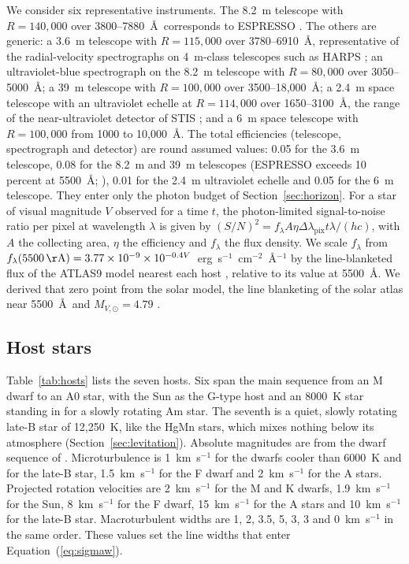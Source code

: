 \documentclass[final,5p]{elsarticle}
\begin{document}
We consider six representative instruments. The 8.2~m telescope with $R = 140{,}000$ over 3800--7880~\AA\ corresponds to ESPRESSO \citep{Pepe2021}. The others are generic: a 3.6~m telescope with $R = 115{,}000$ over 3780--6910~\AA, representative of the radial-velocity spectrographs on 4~m-class telescopes such as HARPS \citep{Mayor2003}; an ultraviolet-blue spectrograph on the 8.2~m telescope with $R = 80{,}000$ over 3050--5000~\AA; a 39~m telescope with $R = 100{,}000$ over 3500--18{,}000~\AA; a 2.4~m space telescope with an ultraviolet echelle at $R = 114{,}000$ over 1650--3100~\AA, the range of the near-ultraviolet detector of STIS \citep{Woodgate1998}; and a 6~m space telescope with $R = 100{,}000$ from 1000 to 10{,}000~\AA. The total efficiencies (telescope, spectrograph and detector) are round assumed values: 0.05 for the 3.6~m telescope, 0.08 for the 8.2~m and 39~m telescopes (ESPRESSO exceeds 10 percent at 5500~\AA; \citealt{Pepe2021}), 0.01 for the 2.4~m ultraviolet echelle and 0.05 for the 6~m telescope. They enter only the photon budget of Section~\ref{sec:horizon}. For a star of visual magnitude $V$ observed for a time $t$, the photon-limited signal-to-noise ratio per pixel at wavelength $\lambda$ is given by $(S/N)^2 = f_\lambda A \eta \Delta\lambda_\mathrm{pix} t \lambda / (hc)$, with $A$ the collecting area, $\eta$ the efficiency and $f_\lambda$ the flux density. We scale $f_\lambda$ from $f_\lambda(5500\,\mathrm{\AA}) = 3.77\times10^{-9} \times 10^{-0.4V}$~erg~s$^{-1}$~cm$^{-2}$~\AA$^{-1}$ by the line-blanketed flux of the ATLAS9 model nearest each host \citep{CastelliKurucz2003}, relative to its value at 5500~\AA. We derived that zero point from the solar model, the line blanketing of the solar atlas near 5500~\AA\ and $M_{V,\odot} = 4.79$ \citep{PecautMamajek2013}.

\subsection{Host stars}
\label{sec:hosts}

Table~\ref{tab:hosts} lists the seven hosts. Six span the main sequence from an M dwarf to an A0 star, with the Sun as the G-type host and an 8000~K star standing in for a slowly rotating Am star. The seventh is a quiet, slowly rotating late-B star of 12{,}250~K, like the HgMn stars, which mixes nothing below its atmosphere (Section~\ref{sec:levitation}). Absolute magnitudes are from the dwarf sequence of \citet{PecautMamajek2013}. Microturbulence is 1~km~s$^{-1}$ for the dwarfs cooler than 6000~K and for the late-B star, 1.5~km~s$^{-1}$ for the F dwarf and 2~km~s$^{-1}$ for the A stars. Projected rotation velocities are 2~km~s$^{-1}$ for the M and K dwarfs, 1.9~km~s$^{-1}$ for the Sun, 8~km~s$^{-1}$ for the F dwarf, 15~km~s$^{-1}$ for the A stars and 10~km~s$^{-1}$ for the late-B star. Macroturbulent widths are 1, 2, 3.5, 5, 3, 3 and 0~km~s$^{-1}$ in the same order. These values set the line widths that enter Equation~(\ref{eq:sigmaw}).
\end{document}
